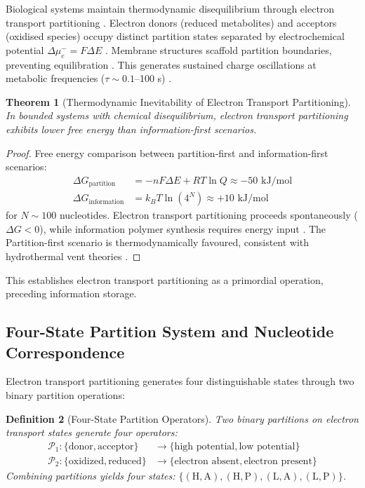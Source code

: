 \documentclass[11pt,a4paper]{article}
\newtheorem{theorem}{Theorem}[section]
\newtheorem{definition}[theorem]{Definition}
\theoremstyle{remark}
\begin{document}
Biological systems maintain thermodynamic disequilibrium through electron transport partitioning \citep{nicholls2013bioenergetics, mitchell1961coupling, beinert1997iron}. Electron donors (reduced metabolites) and acceptors (oxidised species) occupy distinct partition states separated by electrochemical potential $\Delta\mu_e^- = F\Delta E$ \citep{mitchell1961coupling}. Membrane structures scaffold partition boundaries, preventing equilibration \citep{nicholls2013bioenergetics}. This generates sustained charge oscillations at metabolic frequencies ($\tau \sim 0.1$--100 s) \citep{goldbeter1996biochemical, Sachikonye2025_Origins}.

\begin{theorem}[Thermodynamic Inevitability of Electron Transport Partitioning]
\label{thm:electron_partition}
In bounded systems with chemical disequilibrium, electron transport partitioning exhibits lower free energy than information-first scenarios.
\end{theorem}

\begin{proof}
Free energy comparison between partition-first and information-first scenarios:
\begin{align}
\Delta G_{\text{partition}} &= -nF\Delta E + RT\ln Q \approx -50 \text{ kJ/mol} \\
\Delta G_{\text{information}} &= k_BT \ln(4^N) \approx +10 \text{ kJ/mol}
\end{align}
for $N \sim 100$ nucleotides. Electron transport partitioning proceeds spontaneously ($\Delta G < 0$), while information polymer synthesis requires energy input \citep{orgel1968evolution, orgel2004prebiotic}. The Partition-first scenario is thermodynamically favoured, consistent with hydrothermal vent theories \citep{russell2007alkaline}.
\end{proof}

This establishes electron transport partitioning as a primordial operation, preceding information storage.

\subsection{Four-State Partition System and Nucleotide Correspondence}

Electron transport partitioning generates four distinguishable states through two binary partition operations:

\begin{definition}[Four-State Partition Operators]
\label{def:four_state}
Two binary partitions on electron transport states generate four operators:
\begin{align}
\mathcal{P}_1: \{\text{donor}, \text{acceptor}\} &\to \{\text{high potential}, \text{low potential}\} \\
\mathcal{P}_2: \{\text{oxidized}, \text{reduced}\} &\to \{\text{electron absent}, \text{electron present}\}
\end{align}
Combining partitions yields four states: $\{(\text{H},\text{A}), (\text{H},\text{P}), (\text{L},\text{A}), (\text{L},\text{P})\}$.
\end{definition}
\end{document}
